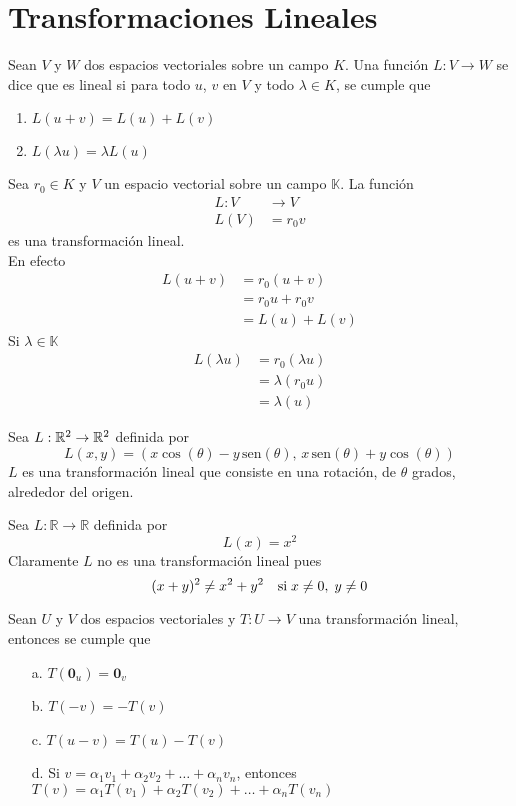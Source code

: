 \chapter{Transformaciones Lineales}

\begin{dfn}
Sean $V$ y $W$ dos espacios vectoriales sobre un campo $K$. Una función $L: V \to W$ se dice que es lineal si para todo $u$, $v$ en $V$ y todo $\lambda \in K$, se cumple que
\begin{enumerate}
\item $L (u+v) = L(u) + L(v)$
\item $L(\lambda u) = \lambda L(u)$
\end{enumerate}
\end{dfn}

\begin{ejemplo}
Sea $r_0 \in K$ y $V$ un espacio vectorial sobre un campo $\mathbb{K}$. La función 
\begin{align*}
L: V &\to V\\
L(V) &= r_0 v
\end{align*}
es una transformación lineal.\\
En efecto 
\begin{align*}
L(u+v) &= r_0 (u+v)\\
&= r_0 u + r_0 v\\
&= L(u)+L(v)
\end{align*}
Si $\lambda \in \mathbb{K}$
\begin{align*}
L(\lambda u) &= r_0 (\lambda u)\\
&= \lambda (r_0 u)\\
&=\lambda (u)
\end{align*}
\end{ejemplo}

\begin{ejemplo}
Sea $L: \mathbb{R}^2 \to \mathbb{R}^2$ definida por
$$L(x,y) = (x \cos(\theta) - y\, \mathrm{sen} (\theta) ,\, x\, \mathrm{sen}(\theta) + y \cos (\theta))$$
$L$ es una transformación lineal que consiste en una rotación, de $\theta$ grados, alrededor del origen.
\end{ejemplo}

\begin{ejemplo}
Sea $L: \mathbb{R} \to \mathbb{R}$ definida por 
$$L(x) = x^2$$
Claramente $L$ no es una transformación lineal pues
$$(x+y)^2 \neq x^2 + y^2  \ \ \ \textup{si} \; x\neq 0 ,\; y \neq 0$$
\end{ejemplo}

\begin{theorem}
Sean $U$ y $V$ dos espacios vectoriales y $T: U \to V$ una transformación lineal, entonces se cumple que
\begin{itemize}
\item[a. ] $T(\mathbf{0}_u) = \mathbf{0}_v$
\item[b. ] $T(-v) = -T(v)$
\item[c. ] $T(u - v) = T(u) - T(v)$
\item[d. ] Si $v = \alpha_1 v_1 + \alpha_2 v_2 + \ldots + \alpha_n v_n$, entonces $T(v) = \alpha_1 T(v_1) + \alpha_2 T(v_2) + \ldots + \alpha_n T(v_n)$
\end{itemize}
\end{theorem}

